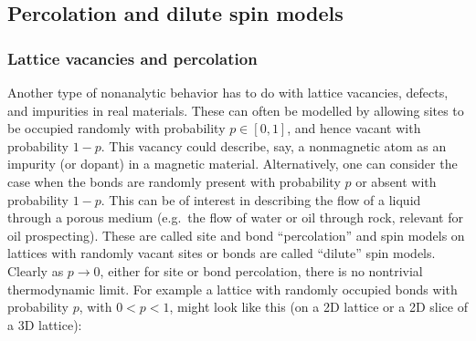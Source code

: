 \subsection{Percolation and dilute spin models}
\subsubsection*{Lattice vacancies and percolation}

Another type of nonanalytic behavior has to do with lattice vacancies, defects, and impurities in real materials. These
can often be modelled by allowing sites to be occupied randomly with probability $p\in[0,1]$, and hence vacant with
probability $1-p$. This vacancy could describe, say, a nonmagnetic atom as an impurity (or dopant) in a magnetic material.
Alternatively, one can consider the case when the bonds are randomly present with probability $p$ or absent with
probability $1-p$. This can be of interest in describing the flow of a liquid through a porous medium (e.g.\ the flow of
water or oil through rock, relevant for oil prospecting). These are called site and bond ``percolation'' and spin models on
lattices with randomly vacant sites or bonds are called ``dilute'' spin models. Clearly as $p\to 0$, either for site or
bond percolation, there is no nontrivial thermodynamic limit. For example a lattice with randomly occupied bonds with
probability $p$, with $0<p<1$, might look like this (on a 2D lattice or a 2D slice of a 3D lattice):

\begin{diagram}
\end{diagram}

